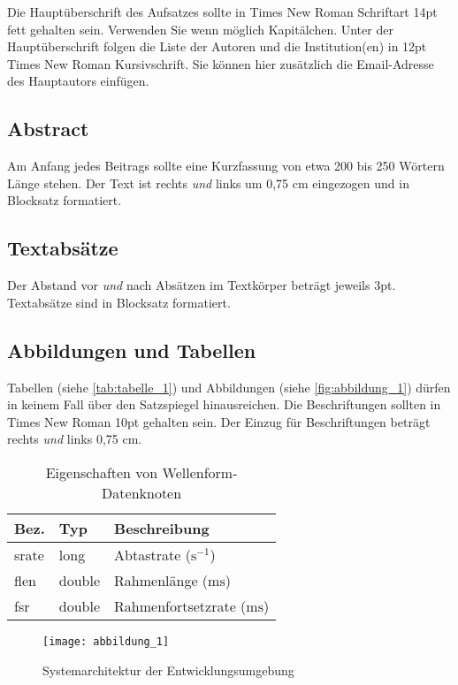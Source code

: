 \documentclass[12pt,a4paper]{article}
\begin{document}
Die Hauptüberschrift des Aufsatzes sollte in Times New Roman Schriftart 14pt fett gehalten sein. 
Verwenden Sie wenn möglich Kapitälchen. Unter der Hauptüberschrift folgen die Liste der Autoren 
und die Institution(en) in 12pt Times New Roman Kursivschrift. Sie können hier zusätzlich die 
Email-Adresse des Hauptautors einfügen. 

\subsection{Abstract}

Am Anfang jedes Beitrags sollte eine Kurzfassung von etwa 200 bis 250 Wörtern Länge stehen. 
Der Text ist rechts \emph{und} links um 0,75 cm eingezogen und in Blocksatz formatiert. 

\subsection{Textabsätze}

Der Abstand vor \emph{und} nach Absätzen im Textkörper beträgt jeweils 3pt. 
Textabsätze sind in Blocksatz formatiert.

\subsection{Abbildungen und Tabellen}

Tabellen (siehe \autoref{tab:tabelle_1}) und Abbildungen (siehe \autoref{fig:abbildung_1})
dürfen in keinem Fall über den Satzspiegel hinausreichen. 
Die Beschriftungen sollten in Times New Roman 10pt gehalten sein. Der Einzug für Beschriftungen 
beträgt rechts \emph{und} links 0,75 cm. 

\begin{table}[hbt]
  \caption{Eigenschaften von Wellenform-Datenknoten}
  \begin{tabular}{|l|l|l|}
    \hline
    \textbf{Bez.} & \textbf{Typ} & \textbf{Beschreibung}\\
    \hline
    srate & long & Abtastrate ($\mathrm{s}^{-1}$)\\
    \hline
    flen & double & Rahmenlänge ($\mathrm{ms}$)\\
    \hline
    fsr & double & Rahmenfortsetzrate ($\mathrm{ms}$)\\
    \hline
  \end{tabular}
  \label{tab:tabelle_1}
\end{table}

\begin{figure}[hbt]
  \centering
  \texttt{[image: abbildung\_1]}
  \caption{Systemarchitektur der Entwicklungsumgebung}
  \label{fig:abbildung_1}
\end{figure}
\end{document}
